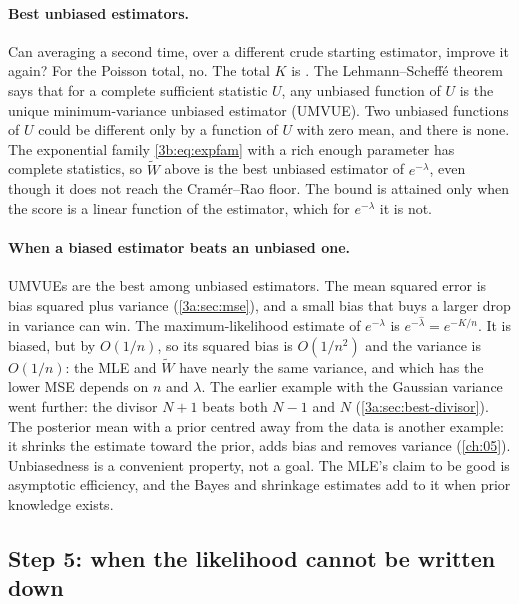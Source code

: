 \paragraph{Best unbiased estimators.}
Can averaging a second time, over a different crude starting estimator,
improve it again? For the Poisson total, no. The total $K$ is
 . The Lehmann--Scheffé theorem
 says that for a complete sufficient
statistic $U$, any unbiased function of $U$ is the unique
minimum-variance unbiased estimator (UMVUE). Two unbiased functions of $U$
could be different only by a function of $U$ with zero mean, and there is
none. The exponential family \eqref{3b:eq:expfam} with a rich enough
parameter has complete statistics, so $\tilde W$ above is the best unbiased
estimator of $e^{-\lambda}$, even though it does not reach the Cram\'er--Rao
floor. The bound is attained only when the score is a linear function of the
estimator, which for $e^{-\lambda}$ it is not.

\paragraph{When a biased estimator beats an unbiased one.}
UMVUEs are the best among unbiased estimators. The mean squared error is
bias squared plus variance (\cref{3a:sec:mse}), and a small bias that buys a
larger drop in variance can win. The maximum-likelihood estimate of
$e^{-\lambda}$ is $e^{-\hat\lambda}=e^{-K/n}$. It is biased, but by
$O(1/n)$, so its squared bias is $O(1/n^2)$ and the variance is $O(1/n)$:
the MLE and $\tilde W$ have nearly the same variance, and which has the
lower MSE depends on $n$ and $\lambda$. The earlier example with the
Gaussian variance went further: the divisor $N+1$ beats both $N-1$ and $N$
(\cref{3a:sec:best-divisor}). The posterior mean with a prior centred away
from the data is another example: it shrinks the estimate toward the prior,
adds bias and removes variance (\cref{ch:05}). Unbiasedness is a convenient
property, not a goal. The MLE's claim to be good is asymptotic efficiency, and
the Bayes and shrinkage estimates add to it when prior knowledge exists.

\subsection{Step 5: when the likelihood cannot be written down}
\label{3b:sec:recipe-intractable}

